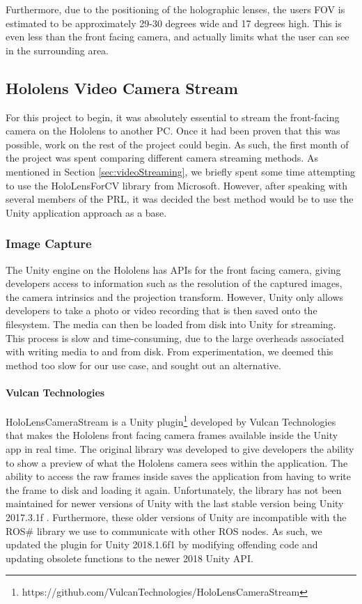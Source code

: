 Furthermore, due to the positioning of the holographic lenses, the users FOV is estimated to be approximately 29-30 degrees wide and 17 degrees high. This is even less than the front facing camera, and actually limits what the user can see in the surrounding area.

\subsection{Hololens Video Camera Stream}
For this project to begin, it was absolutely essential to stream the front-facing camera on the Hololens to another PC. Once it had been proven that this was possible, work on the rest of the project could begin. As such, the first month of the project was spent comparing different camera streaming methods. As mentioned in Section \ref{sec:videoStreaming}, we briefly spent some time attempting to use the HoloLensForCV library from Microsoft. However, after speaking with several members of the PRL, it was decided the best method would be to use the Unity application approach as a base.

\subsubsection{Image Capture}
The Unity engine on the Hololens has APIs for the front facing camera, giving developers access to information such as the resolution of the captured images, the camera intrinsics and the projection transform. However, Unity only allows developers to take a photo or video recording that is then saved onto the filesystem. The media can then be loaded from disk into Unity for streaming. This process is slow and time-consuming, due to the large overheads associated with writing media to and from disk. From experimentation, we deemed this method too slow for our use case, and sought out an alternative.

\paragraph{Vulcan Technologies} HoloLensCameraStream is a Unity plugin\footnote{https://github.com/VulcanTechnologies/HoloLensCameraStream} developed by Vulcan Technologies that makes the Hololens front facing camera frames available inside the Unity app in real time. The original library was developed to give developers the ability to show a preview of what the Hololens camera sees within the application. The ability to access the raw frames inside saves the application from having to write the frame to disk and loading it again. Unfortunately, the library has not been maintained for newer versions of Unity with the last stable version being Unity 2017.3.1f . Furthermore, these older versions of Unity are incompatible with the ROS\# library we use to communicate with other ROS nodes. As such, we updated the plugin for Unity 2018.1.6f1 by modifying offending code and updating obsolete functions to the newer 2018 Unity API.

